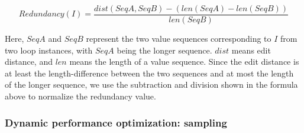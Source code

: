 
\[
{
	Redundancy(I) =  \frac{dist(SeqA,SeqB) - (len(SeqA) - len(SeqB))}{len(SeqB)}
}
\]

Here, $SeqA$ and $SeqB$ represent the two value sequences corresponding to $I$
from two loop instances, with $SeqA$ being the longer sequence.
$dist$ means edit distance, and $len$ means the length of a value sequence.
Since the edit distance is at least the length-difference between the
two sequences and at most the length of the longer sequence, we use the 
subtraction and division shown in the formula above to normalize the
redundancy value.




\subsubsection{Dynamic performance optimization: sampling}
\label{sec:inst}

